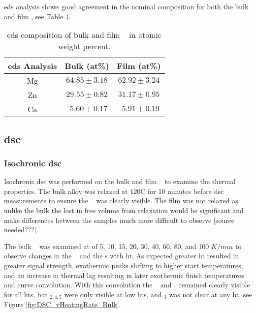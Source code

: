 \documentclass[a4paper,12pt,oneside]{article}%
\begin{document}
\acrshort{eds} analysis shows good agreement in the nominal composition for both the bulk and film \MgZnCa, see Table \ref{tab:EDS_Composition}.

\begin{table}[h]
	\centering
	\caption{\acrshort{eds} composition of bulk and film \MgZnCa~ in atomic weight percent.}
	\begin{tabular}{ c c c }
		\toprule
		\acrshort{eds} Analysis & Bulk (at\%)  & Film (at\%)  \\
		\midrule
		Mg & $64.85 \pm 3.18$ & $62.92 \pm 3.24$ \\
		Zn & $29.55 \pm 0.82$ & $31.17 \pm 0.95$ \\
		Ca & $~~ 5.60 \pm 0.17$ & $~~ 5.91 \pm 0.19$ \\ 
		\bottomrule
	\end{tabular}
	\label{tab:EDS_Composition}
\end{table}

\subsection{\acrshort{dsc}}
\subsubsection{Isochronic \acrshort{dsc}}
Isochronic \acrshort{dsc} was performed on the bulk and film \MgZnCa~ to examine the thermal properties. The bulk alloy was relaxed at $120$\degree C for 10 minutes before \acrshort{dsc} measurements to ensure the \Tg~ was clearly visible. The film was not relaxed as unlike the bulk the lost in free volume from relaxation would be significant and make differences between the samples much more difficult to observe [source needed???]. 

The bulk \MgZnCa~ was examined at  of 5, 10, 15, 20, 30, 40, 60, 80, and 100 $K/min$ to observe changes in the \Tg~ and the \Tx s with \gls{ht}. As expected greater \gls{ht} resulted in greater signal strength, exothermic peaks shifting to higher start temperatures, and an increase in thermal lag resulting in later exothermic finish temperatures and curve convolution. With this convolution the \Tg~ and \Tx $_{1}$  remained clearly visible for all \glspl{ht}, but \Tx $_{2,4,5}$ were only visible at low \glspl{ht}, and \Tx $_{3}$ was not clear at any \gls{ht}, see Figure \ref{fig:DSC_vHeatingRate_Bulk}.
\end{document}
